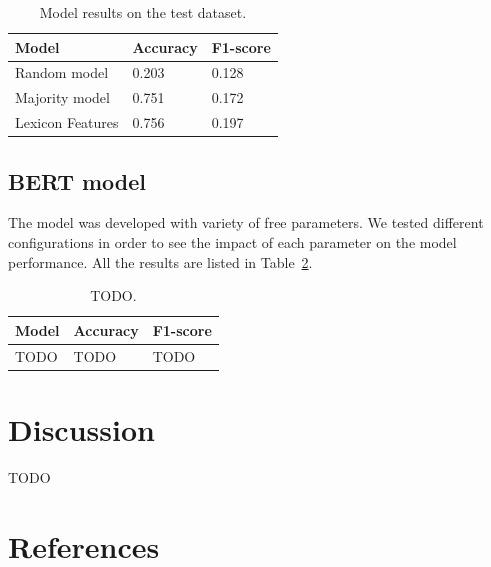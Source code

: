 \documentclass[11pt,a4paper]{article}
\begin{document}
\begin{table}[h]
\centering
\begin{tabular}{lll}
Model            & Accuracy & F1-score \\ \hline
Random model     & 0.203    & 0.128    \\
Majority model   & 0.751    & 0.172    \\
Lexicon Features & 0.756    & 0.197   
\end{tabular}
\caption{Model results on the test dataset.}
\label{tab:results}
\end{table}

\subsection{BERT model}

The model was developed with variety of free parameters.
We tested different configurations in order to see the impact of each parameter on the model performance.
All the results are listed in Table~\ref{tab:bert-results}.

\begin{table}[h]
\centering
\begin{tabular}{lll}
Model            & Accuracy & F1-score \\ \hline
TODO             & TODO     & TODO
\end{tabular}
\caption{TODO.}
\label{tab:bert-results}
\end{table}


\section{Discussion}

TODO



\section{References}



\end{document}
